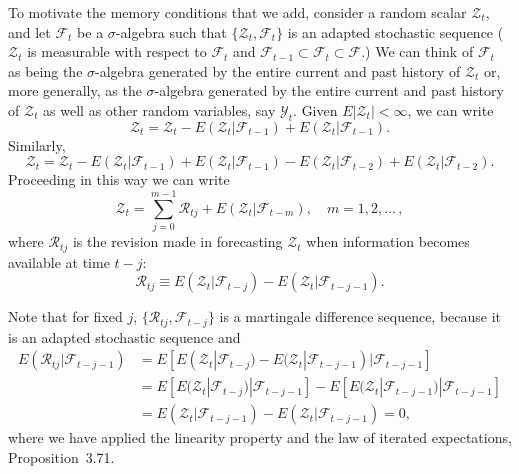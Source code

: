 To motivate the memory conditions that we add, consider a random scalar $\mathcal{Z}_t$, and let $\mathcal{F}_t$ be a $\sigma$-algebra such that $\{\mathcal{Z}_t, \mathcal{F}_t\}$ is an adapted stochastic sequence ($\mathcal{Z}_t$ is measurable with respect to $\mathcal{F}_t$ and $\mathcal{F}_{t-1} \subset \mathcal{F}_t \subset \mathcal{F}$.) We can think of $\mathcal{F}_t$ as being the $\sigma$-algebra generated by the entire current and past history of $\mathcal{Z}_t$ or, more generally, as the $\sigma$-algebra generated by the entire current and past history of $\mathcal{Z}_t$ as well as other random variables, say $\mathcal{Y}_t$. Given $E|\mathcal{Z}_t| < \infty$, we can write
\[
\mathcal{Z}_t = \mathcal{Z}_t - E(\mathcal{Z}_t|\mathcal{F}_{t-1}) + E(\mathcal{Z}_t|\mathcal{F}_{t-1}).
\]
Similarly,
\[
\mathcal{Z}_t = \mathcal{Z}_t - E(\mathcal{Z}_t|\mathcal{F}_{t-1}) + E(\mathcal{Z}_t|\mathcal{F}_{t-1}) - E(\mathcal{Z}_t|\mathcal{F}_{t-2}) + E(\mathcal{Z}_t|\mathcal{F}_{t-2}).
\]
Proceeding in this way we can write
\[
\mathcal{Z}_t = \sum_{j=0}^{m-1} \mathcal{R}_{tj} + E(\mathcal{Z}_t|\mathcal{F}_{t-m}), \quad m = 1, 2, \ldots\,,
\]
where $\mathcal{R}_{tj}$ is the revision made in forecasting $\mathcal{Z}_t$ when information becomes available at time $t - j$:
\[
\mathcal{R}_{tj} \equiv E(\mathcal{Z}_t|\mathcal{F}_{t-j}) - E(\mathcal{Z}_t|\mathcal{F}_{t-j-1}).
\]

Note that for fixed $j$, $\{\mathcal{R}_{tj}, \mathcal{F}_{t-j}\}$ is a martingale difference sequence, because it is an adapted stochastic sequence and
\begin{align*}
E(\mathcal{R}_{tj}|\mathcal{F}_{t-j-1}) &= E[E(\mathcal{Z}_t|\mathcal{F}_{t-j}) - E(\mathcal{Z}_t|\mathcal{F}_{t-j-1})|\mathcal{F}_{t-j-1}] \\
&= E[E(\mathcal{Z}_t|\mathcal{F}_{t-j})|\mathcal{F}_{t-j-1}] - E[E(\mathcal{Z}_t|\mathcal{F}_{t-j-1})|\mathcal{F}_{t-j-1}] \\
&= E(\mathcal{Z}_t|\mathcal{F}_{t-j-1}) - E(\mathcal{Z}_t|\mathcal{F}_{t-j-1}) = 0,
\end{align*}
where we have applied the linearity property and the law of iterated expectations, Proposition~3.71.

